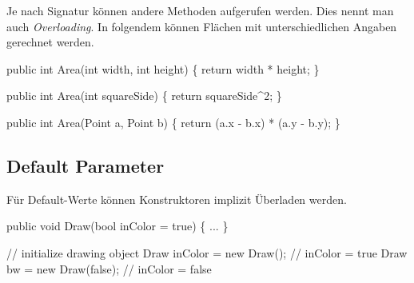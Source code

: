 \documentclass[
  9pt,
  a4paperpaper,
  DIV=11]{scrartcl}
\newenvironment{Shaded}{}{}
\newcommand{\CommentTok}[1]{\textcolor[rgb]{0.42,0.45,0.49}{#1}}
\newcommand{\DataTypeTok}[1]{\textcolor[rgb]{0.84,0.23,0.29}{#1}}
\newcommand{\DecValTok}[1]{\textcolor[rgb]{0.00,0.36,0.77}{#1}}
\newcommand{\FunctionTok}[1]{\textcolor[rgb]{0.44,0.26,0.76}{#1}}
\newcommand{\KeywordTok}[1]{\textcolor[rgb]{0.84,0.23,0.29}{#1}}
\newcommand{\NormalTok}[1]{\textcolor[rgb]{0.14,0.16,0.18}{#1}}
\newcommand{\OperatorTok}[1]{\textcolor[rgb]{0.14,0.16,0.18}{#1}}
\numberwithin{equation}{section}
\begin{document}
\begin{multicols}{2}
Je nach Signatur können andere Methoden aufgerufen werden. Dies nennt
man auch \emph{Overloading}. In folgendem können Flächen mit
unterschiedlichen Angaben gerechnet werden.

\begin{Shaded}
\begin{Highlighting}[]
\KeywordTok{public} \DataTypeTok{int} \FunctionTok{Area}\OperatorTok{(}\DataTypeTok{int}\NormalTok{ width}\OperatorTok{,} \DataTypeTok{int}\NormalTok{ height}\OperatorTok{)} \OperatorTok{\{}
  \KeywordTok{return}\NormalTok{ width }\OperatorTok{*}\NormalTok{ height}\OperatorTok{;}
\OperatorTok{\}}

\KeywordTok{public} \DataTypeTok{int} \FunctionTok{Area}\OperatorTok{(}\DataTypeTok{int}\NormalTok{ squareSide}\OperatorTok{)} \OperatorTok{\{}
  \KeywordTok{return}\NormalTok{ squareSide}\OperatorTok{\^{}}\DecValTok{2}\OperatorTok{;}
\OperatorTok{\}}

\KeywordTok{public} \DataTypeTok{int} \FunctionTok{Area}\OperatorTok{(}\NormalTok{Point a}\OperatorTok{,}\NormalTok{ Point b}\OperatorTok{)} \OperatorTok{\{}
  \KeywordTok{return} \OperatorTok{(}\NormalTok{a}\OperatorTok{.}\FunctionTok{x} \OperatorTok{{-}}\NormalTok{ b}\OperatorTok{.}\FunctionTok{x}\OperatorTok{)} \OperatorTok{*} \OperatorTok{(}\NormalTok{a}\OperatorTok{.}\FunctionTok{y} \OperatorTok{{-}}\NormalTok{ b}\OperatorTok{.}\FunctionTok{y}\OperatorTok{);}
\OperatorTok{\}}
\end{Highlighting}
\end{Shaded}

\hypertarget{default-parameter}{%
\subsection{Default Parameter}\label{default-parameter}}

Für Default-Werte können Konstruktoren implizit Überladen werden.

\begin{Shaded}
\begin{Highlighting}[]
\KeywordTok{public} \DataTypeTok{void} \FunctionTok{Draw}\OperatorTok{(}\DataTypeTok{bool}\NormalTok{ inColor }\OperatorTok{=} \KeywordTok{true}\OperatorTok{)} \OperatorTok{\{} \OperatorTok{...} \OperatorTok{\}}

\CommentTok{// initialize drawing object}
\NormalTok{Draw inColor }\OperatorTok{=} \KeywordTok{new} \FunctionTok{Draw}\OperatorTok{();}    \CommentTok{// inColor = true}
\NormalTok{Draw bw }\OperatorTok{=} \KeywordTok{new} \FunctionTok{Draw}\OperatorTok{(}\KeywordTok{false}\OperatorTok{);}    \CommentTok{// inColor = false}
\end{Highlighting}
\end{Shaded}


\end{multicols}
\end{document}
